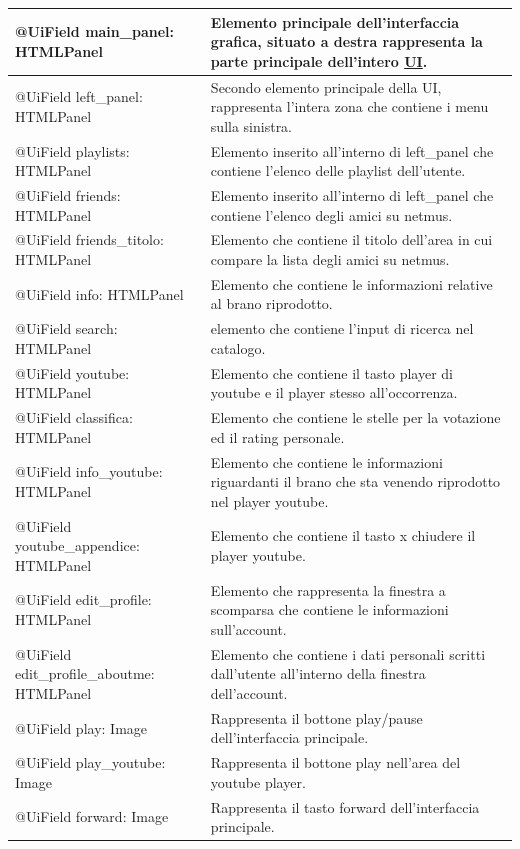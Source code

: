 \begin{longtable}{|p{}|p{}|}
@UiField main\_panel: HTMLPanel & Elemento principale dell'interfaccia
grafica, situato a destra rappresenta la parte principale dell'intero
\underline{UI}.\\\hline @UiField left\_panel: HTMLPanel & Secondo elemento
principale della UI, rappresenta l'intera zona che contiene i menu sulla sinistra.\\\hline
@UiField playlists: HTMLPanel & Elemento inserito all'interno di
left\_panel che contiene l'elenco delle playlist dell'utente.\\\hline
@UiField friends: HTMLPanel & Elemento inserito all'interno di
left\_panel che contiene l'elenco degli amici su netmus.\\\hline
@UiField friends\_titolo: HTMLPanel & Elemento che contiene il titolo
dell'area in cui compare la lista degli amici su netmus.\\\hline
@UiField info: HTMLPanel & Elemento che contiene le informazioni
relative al brano riprodotto.\\\hline
@UiField search: HTMLPanel & elemento che contiene l'input di ricerca
nel catalogo.\\\hline
@UiField youtube: HTMLPanel & Elemento che contiene il tasto player di
youtube e il player stesso all'occorrenza.\\\hline
@UiField classifica: HTMLPanel & Elemento che contiene le stelle per la
votazione ed il rating personale.\\\hline
@UiField info\_youtube: HTMLPanel & Elemento che contiene le informazioni
riguardanti il brano che sta venendo riprodotto nel player youtube.\\\hline
@UiField youtube\_appendice: HTMLPanel & Elemento che contiene il tasto
x chiudere il player youtube.\\\hline
@UiField edit\_profile: HTMLPanel & Elemento che rappresenta la finestra
a scomparsa che contiene le informazioni sull'account.\\\hline
@UiField edit\_profile\_aboutme: HTMLPanel & Elemento che contiene i
dati personali scritti dall'utente all'interno della finestra
dell'account.\\\hline
@UiField play: Image & Rappresenta il bottone play/pause
dell'interfaccia principale.\\\hline
@UiField play\_youtube: Image & Rappresenta il bottone play nell'area del
youtube player.\\\hline
@UiField forward: Image & Rappresenta il tasto forward dell'interfaccia
principale.\\\hline

\end{longtable}
